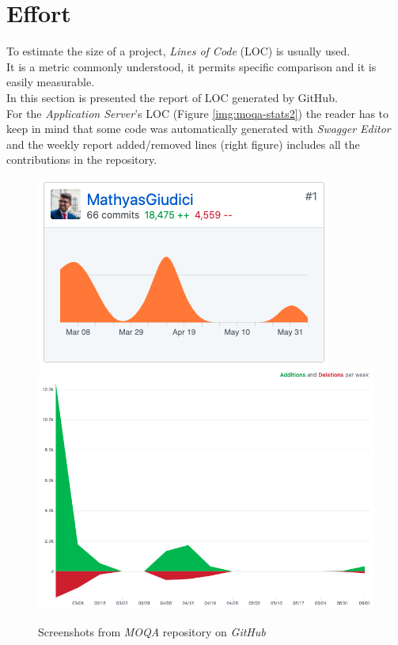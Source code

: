 \section{Effort}
To estimate the size of a project, \textit{Lines of Code} (LOC) is usually used.\\
It is a metric commonly understood, it permits specific comparison and it is easily measurable.\\

In this section is presented the report of LOC generated by GitHub.\\

For the \textit{Application Server}'s LOC (Figure \ref{img:moqa-stats2}) the reader has to keep in mind that some code was automatically generated with \textit{Swagger Editor} and the weekly report added/removed lines (right figure) includes all the contributions in the repository.

\begin{figure}[H]
\centering
\includegraphics[width=.45\textwidth]{./img/effort/moqa-stat1.png}
\includegraphics[width=.45\textwidth]{./img/effort/moqa-stat2.png}
\hspace{0.05\linewidth}
\caption{Screenshots from \textit{MOQA} repository on \textit{GitHub}}
\label{img:moqa-stats}
\end{figure}

